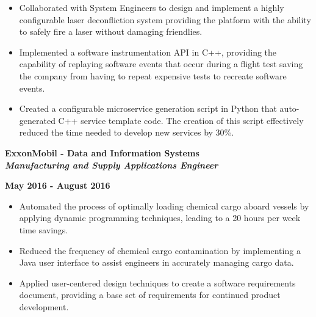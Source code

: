 \documentclass[10pt,letterpaper]{article}
\begin{document}
\begin{itemize}[noitemsep,topsep=0pt]
    \setlength\itemsep{-0.10em}
    \item Collaborated with System Engineers to design and implement a highly configurable laser
        deconfliction system providing the platform with the ability to safely fire a laser without
        damaging friendlies.
    \item Implemented a software instrumentation API in C++, providing the capability of replaying software
        events that occur during a flight test saving the company from having to repeat expensive tests to
        recreate software events.
    \item Created a configurable microservice generation script in Python that auto-generated C++ service
        template code. The creation of this script effectively reduced the time needed to develop
        new services by 30\%.
\end{itemize}

\medskip

\begin{minipage}[t]{0.53\textwidth}
    \begin{flushleft}
        \textbf{ExxonMobil - Data and Information Systems}\\
        \textbf{\textit{Manufacturing and Supply Applications Engineer}}\\
    \end{flushleft}
\end{minipage}
\begin{minipage}[t]{0.44\textwidth}
    \begin{flushright}
        \textbf{May 2016 - August 2016}
    \end{flushright}
\end{minipage}

\begin{itemize}[noitemsep,topsep=0pt]
    \setlength\itemsep{-0.10em}
    \item Automated the process of optimally loading chemical cargo aboard
        vessels by applying dynamic programming techniques, leading to a 20
        hours per week time savings.
    \item Reduced the frequency of chemical cargo contamination by implementing
        a Java user interface to assist engineers in accurately managing cargo data.
    \item Applied user-centered design techniques to create a software
        requirements document, providing a base set of requirements for continued
        product development.
\end{itemize}
\end{document}
